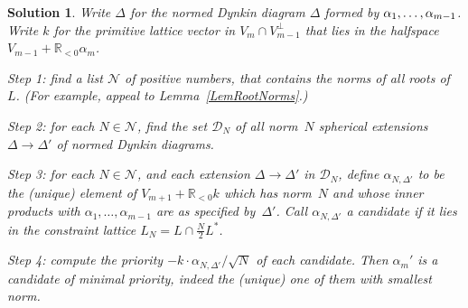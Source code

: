 \documentclass[12pt]{amsart}
\def\calD{\mathcal{D}}
\def\calN{\mathcal{N}}
\def\R{\mathbb{R}}
\def\D{\Delta}
\numberwithin{theorem}{section}
\numberwithin{equation}{section}
\numberwithin{figure}{section}
\newtheorem*{SolutionToSphericalIterative}{Solution}
\theoremstyle{remark}
\begin{document}
\begin{SolutionToSphericalIterative}
Write $\D$ for the 
normed Dynkin diagram
    $\D$ formed by $\alpha_1,\discretionary{}{}{}\dots,\discretionary{}{}{}\alpha_{m-1}$. 
    Write $k$ for
    the primitive lattice vector in $V_m\cap V_{m-1}^\perp$ that lies in the halfspace
$V_{m-1}+\R_{<0}\alpha_m$.

Step 1: find a list $\calN$ of positive numbers,
that contains the norms of all roots of~$L$.  
    (For example, appeal to
    Lemma~\ref{LemRootNorms}.)

Step 2: for each $N\in\calN$, find the set
$\calD_N$ of all norm~$N$ spherical extensions $\D\to\D'$ of normed 
    Dynkin diagrams.  

Step 3: for each $N\in\calN$, and each extension $\D\to\D'$ in $\calD_N$,
define $\alpha_{N,\D'}$ to be the (unique) element of $V_{m+1}+\R_{<0}k$ which
has norm~$N$ and whose inner products with $\alpha_1,\dots,\alpha_{m-1}$ are as
specified by~$\D'$.  
Call $\alpha_{N,\D'}$  a candidate if it lies in 
    the constraint lattice $L_N=L\cap \frac{N}{2}L^*$.

    Step 4: compute the priority $-k\cdot\alpha_{N,\D'}/\sqrt{N}$ of each candidate.
    Then $\alpha_m'$ is a candidate of  minimal priority, indeed
    the  (unique) one of them with smallest norm.
\end{SolutionToSphericalIterative}
\end{document}
